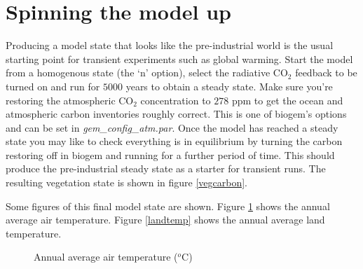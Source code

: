 \documentclass[10pt,a4paper]{report}
\begin{document}
\section{Spinning the model up}

Producing a model state that looks like the pre-industrial world is
the usual starting point for transient experiments such as global
warming. Start the model from a homogenous state (the `n' option),
select the radiative CO$_{2}$ feedback to be turned on and run for
$5000$ years to obtain a steady state. Make sure you're restoring
the atmospheric CO$_{2}$ concentration to $278$ ppm to get the ocean
and atmospheric carbon inventories roughly correct. This is one of
biogem's options and can be set in {\em gem\_config\_atm.par}. Once
the model has reached a steady state you may like to check
everything is in equilibrium by turning the carbon restoring off in
biogem and running for a further period of time. This should produce
the pre-industrial steady state as a starter for transient runs. The
resulting vegetation state is shown in figure \ref{vegcarbon}.

Some figures of this final model state are shown. Figure
\ref{airtemp} shows the annual average air temperature. Figure
\ref{landtemp} shows the annual average land temperature.

\begin{figure}
\centerline{}
\caption{Annual average air temperature ($^{o}$C)}\label{airtemp}
\end{figure}
\end{document}
